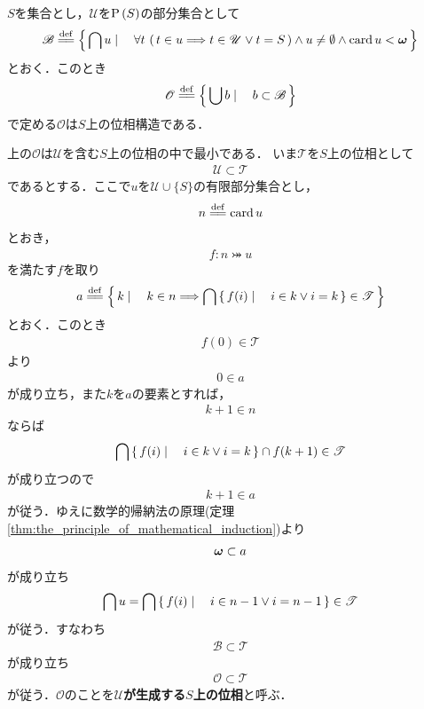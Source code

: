 	\begin{screen}
		\begin{thm}[位相の生成]\label{thm:generation_of_topology}
			$S$を集合とし，$\mathscr{U}$を$\operatorname*{P} \left(S\right)$の部分集合として
			\begin{align}
				\mathscr{B} \defeq \Set{\bigcap u}{
				\forall t\, \left(\, t \in u \Longrightarrow t \in \mathscr{U} \vee t = S\, \right) \wedge u \neq \emptyset \wedge \card{u} < \Natural}
			\end{align}
			とおく．このとき
			\begin{align}
				\mathscr{O} \defeq \Set{\bigcup b}{b \subset \mathscr{B}}
			\end{align}
			で定める$\mathscr{O}$は$S$上の位相構造である．
		\end{thm}
	\end{screen}
	
	上の$\mathscr{O}$は$\mathscr{U}$を含む$S$上の位相の中で最小である．
	いま$\mathscr{T}$を$S$上の位相として
	\begin{align}
		\mathscr{U} \subset \mathscr{T}
	\end{align}
	であるとする．ここで$u$を$\mathscr{U} \cup \{S\}$の有限部分集合とし，
	\begin{align}
		n \defeq \card{u}
	\end{align}
	とおき，
	\begin{align}
		f:n \bij u
	\end{align}
	を満たす$f$を取り
	\begin{align}
		a \defeq \Set{k}{k \in n \Longrightarrow \bigcap \Set{f(i)}{i \in k \vee i = k} \in \mathscr{T}}
	\end{align}
	とおく．このとき
	\begin{align}
		f(0) \in \mathscr{T}
	\end{align}
	より
	\begin{align}
		0 \in a
	\end{align}
	が成り立ち，また$k$を$a$の要素とすれば，
	\begin{align}
		k+1 \in n
	\end{align}
	ならば
	\begin{align}
		\bigcap \left\{\, f(i) \mid \quad i \in k \vee i = k\, \right\} \cap f(k+1) \in \mathscr{T}
	\end{align}
	が成り立つので
	\begin{align}
		k+1 \in a
	\end{align}
	が従う．ゆえに数学的帰納法の原理(定理\ref{thm:the_principle_of_mathematical_induction})より
	\begin{align}
		{\boldsymbol \omega} \subset a
	\end{align}
	が成り立ち
	\begin{align}
		\bigcap u = \bigcap \left\{\, f(i) \mid \quad i \in n-1 \vee i = n-1\, \right\} \in \mathscr{T}
	\end{align}
	が従う．すなわち
	\begin{align}
		\mathscr{B} \subset \mathscr{T}
	\end{align}
	が成り立ち
	\begin{align}
		\mathscr{O} \subset \mathscr{T}
	\end{align}
	が従う．$\mathscr{O}$のことを{\bf $\mathscr{U}$が生成する$S$上の位相}と呼ぶ．
	
